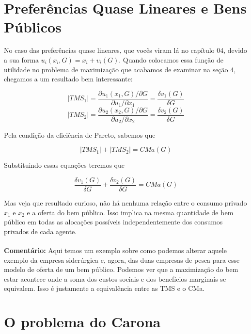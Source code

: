 \documentclass[a4paper,11pt,oneside]{book}
\theoremstyle{definition}
\theoremstyle{break}
\begin{document}
\section{Preferências Quase Lineares e Bens Públicos}

No caso das preferências quase lineares, que vocês viram lá no capítulo 04, devido a sua forma $u_i(x_i,G) = x_i + v_i(G)$. Quando colocamos essa função de utilidade no problema de maximização que acabamos de examinar na seção 4, chegamos a um resultado bem interessante:

$$ |TMS_1| = \frac{\partial u_1(x_1,G) / \partial G}{\partial u_1 / \partial x_1} = \frac{\delta v_1(G)}{\delta G} $$
$$ |TMS_2| = \frac{\partial u_2(x_2,G) / \partial G}{\partial u_2 / \partial x_2} = \frac{\delta v_2(G)}{\delta G} $$

Pela condição da eficiência de Pareto, sabemos que

$$ |TMS_1| + |TMS_2| =  CMa(G) $$

Substituindo essas equações teremos que

$$ \frac{\delta v_1(G)}{\delta G} + \frac{\delta v_2(G)}{\delta G} = CMa(G) $$

Mas veja que resultado curioso, não há nenhuma relação entre o consumo privado $x_1$ e $x_2$ e a oferta do bem público. Isso implica na mesma quantidade de bem público em todas as alocações possíveis independentemente dos consumos privados de cada agente.
\\~\\
\textbf{Comentário:} Aqui temos um exemplo sobre como podemos alterar aquele exemplo da empresa siderúrgica e, agora, das duas empresas de pesca para esse modelo de oferta de um bem público. Podemos ver que a maximização do bem estar acontece onde a soma dos custos sociais e dos benefícios marginais se equivalem. Isso é justamente a equivalência entre as TMS e o CMa.

\section{O problema do Carona}
\end{document}
